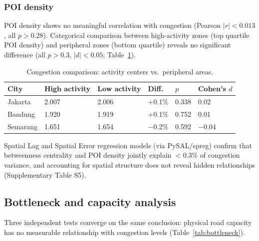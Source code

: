 \documentclass[preprint,12pt,authoryear]{elsarticle}
\begin{document}
\subsubsection{POI density}

POI density shows no meaningful correlation with congestion (Pearson $|r| < 0.013$, all $p > 0.28$). Categorical comparison between high-activity zones (top quartile POI density) and peripheral zones (bottom quartile) reveals no significant difference (all $p > 0.3$, $|d| < 0.05$; Table~\ref{tab:poi}).

\begin{table}[htbp]
\centering
\caption{Congestion comparison: activity centers vs.\ peripheral areas.}
\label{tab:poi}
\begin{tabular}{llllll}
\toprule
City & High activity & Low activity & Diff. & $p$ & Cohen's $d$ \\
\midrule
Jakarta  & 2.007 & 2.006 & +0.1\% & 0.338 & 0.02 \\
Bandung  & 1.920 & 1.919 & +0.1\% & 0.752 & 0.01 \\
Semarang & 1.651 & 1.654 & $-$0.2\% & 0.592 & $-$0.04 \\
\bottomrule
\end{tabular}
\end{table}

Spatial Lag and Spatial Error regression models (via PySAL/spreg) confirm that betweenness centrality and POI density jointly explain $<$0.3\% of congestion variance, and accounting for spatial structure does not reveal hidden relationships (Supplementary Table S5).

\subsection{Bottleneck and capacity analysis}

Three independent tests converge on the same conclusion: physical road capacity has no measurable relationship with congestion levels (Table~\ref{tab:bottleneck}).
\end{document}
